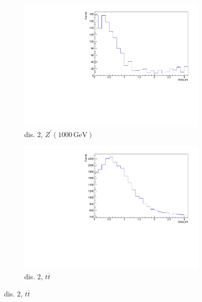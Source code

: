 \begin{figure}[H]
  \begin{subfigure}{0.45\textwidth}%
    \centering%
    \includegraphics[width=\textwidth]{plots/discriminant/zprime1000.el_del_phi.pdf}%
    \caption{dis. 2, $Z^\prime(1000 \, \si{\giga\eV})$}%
    \label{fig:5c}%
  \end{subfigure}%
  \hfill
  \begin{subfigure}{0.45\textwidth}%
    \centering%
    \includegraphics[width=\textwidth]{plots/discriminant/ttbar.el_del_phi.pdf}%
    \caption{dis. 2, $t \overline{t}$}%
    \label{fig:5d}%
  \end{subfigure}%


\end{figure}
